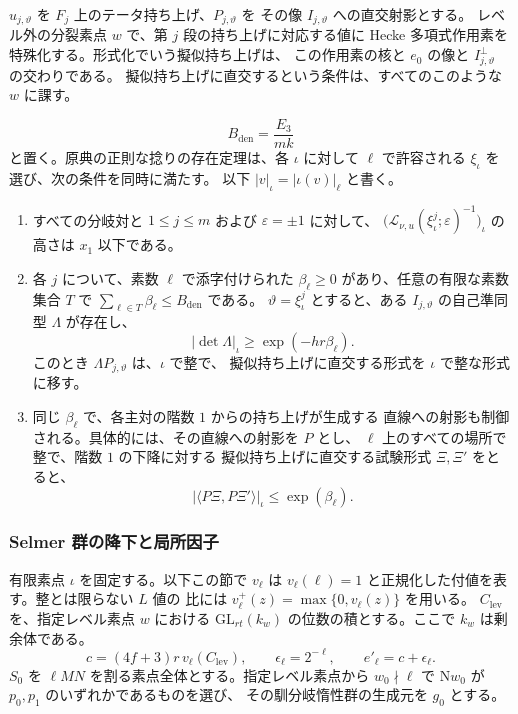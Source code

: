 \(u_{j,\vartheta}\) を \(F_j\) 上のテータ持ち上げ、\(P_{j,\vartheta}\) を
その像 \(I_{j,\vartheta}\) への直交射影とする。
レベル外の分裂素点 \(w\) で、第 \(j\) 段の持ち上げに対応する値に
Hecke 多項式作用素を特殊化する。形式化でいう擬似持ち上げは、
この作用素の核と \(e_0\) の像と \(I_{j,\vartheta}^{\perp}\) の交わりである。
擬似持ち上げに直交するという条件は、すべてのこのような \(w\) に課す。

\[
 B_{\mathrm{den}}=\frac{E_3}{mk}
\]
と置く。原典の正則な捻りの存在定理は、各 \(\iota\) に対して
\(\ell\) で許容される \(\xi_\iota\) を選び、次の条件を同時に満たす。
以下 \(|v|_\iota=|\iota(v)|_\ell\) と書く。
\begin{enumerate}
\item すべての分岐対と \(1\le j\le m\) および \(\varepsilon=\pm1\) に対して、
  \(\bigl(\mathcal L_{\nu,u}(\xi_\iota^j;\varepsilon)^{-1}\bigr)_\iota\)
  の高さは \(x_1\) 以下である。
\item 各 \(j\) について、素数 \(\ell\) で添字付けられた
  \(\beta_\ell\ge 0\) があり、任意の有限な素数集合 \(T\) で
  \(\sum_{\ell\in T}\beta_\ell\le B_{\mathrm{den}}\) である。
  \(\vartheta=\xi_\iota^j\) とすると、ある \(I_{j,\vartheta}\) の自己準同型
  \(\Lambda\) が存在し、
  \[
    |\det\Lambda|_\iota\ge\exp(-hr\beta_\ell).
  \]
  このとき \(\Lambda P_{j,\vartheta}\) は、\(\iota\) で整で、
  擬似持ち上げに直交する形式を \(\iota\) で整な形式に移す。
\item 同じ \(\beta_\ell\) で、各主対の階数 \(1\) からの持ち上げが生成する
  直線への射影も制御される。具体的には、その直線への射影を \(P\) とし、
  \(\ell\) 上のすべての場所で整で、階数 \(1\) の下降に対する
  擬似持ち上げに直交する試験形式 \(\Xi,\Xi'\) をとると、
  \[
       |\langle P\Xi,P\Xi'\rangle|_\iota\le\exp(\beta_\ell).
  \]
\end{enumerate}

\subsubsection{Selmer 群の降下と局所因子}

有限素点 \(\iota\) を固定する。以下この節で \(v_\ell\) は
\(v_\ell(\ell)=1\) と正規化した付値を表す。整とは限らない \(L\) 値の
比には \(v_\ell^+(z)=\max\{0,v_\ell(z)\}\) を用いる。
\(C_{\mathrm{lev}}\) を、指定レベル素点 \(w\) における
\(\mathrm{GL}_{rt}(k_w)\) の位数の積とする。ここで \(k_w\) は剰余体である。
\[
 c=(4f+3)r\,v_\ell(C_{\mathrm{lev}}),\qquad
 \epsilon_\ell=2^{-\ell},\qquad e'_\ell=c+\epsilon_\ell .
\]
\(S_0\) を \(\ell MN\) を割る素点全体とする。指定レベル素点から
\(w_0\nmid\ell\) で \(\mathrm Nw_0\) が \(p_0,p_1\) のいずれかであるものを選び、
その馴分岐惰性群の生成元を \(g_0\) とする。


